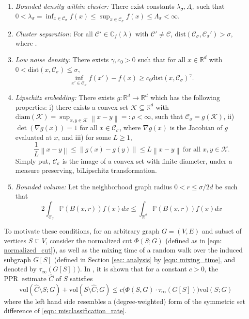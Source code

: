 \documentclass{article}
\newcommand{\diam}{\rho}
\newcommand{\vol}{\mathrm{vol}}
\newcommand{\Reals}{\mathbb{R}}
\newcommand{\Rd}{\Reals^d}
\newcommand{\norm}[1]{\left\lVert#1\right\rVert}
\newcommand{\1}{\mathbf{1}}
\newcommand{\dist}{\mathrm{dist}}
\newcommand{\Pbb}{\mathbb{P}}
\newcommand{\Cbb}{\mathbb{C}}
\newcommand{\Cset}{\mathcal{C}}
\newcommand{\Csig}{\Cset_{\sigma}}
\newcommand{\Cest}{\widehat{C}}
\newcommand{\pprspace}{{\sc PPR~}}
\theoremstyle{aldenthm}
\theoremstyle{aldenrmrk}
\begin{document}
\begin{enumerate}[label=(A\arabic*)]
	\item
	\label{asmp: bounded_density}
	\emph{Bounded density within cluster:} There exist constants $\lambda_{\sigma}, \Lambda_{\sigma}$ such that $0 < \lambda_{\sigma} = \inf_{x \in \Csig} f(x) \leq \sup_{x \in \Csig} f(x) \leq \Lambda_{\sigma} < \infty$.
	
	\item
	\label{asmp: cluster_separation}
	\emph{Cluster separation:}
	For all $\Cset' \in \Cbb_f(\lambda)$ with $\Cset' \not= \Cset$, $\dist(\Csig,\Csig') > \sigma$,
	where \smash{$\dist(\Csig,\Csig') := \inf_{x \in \Csig} \dist(x,\Csig')$}. 
	
	\item 
	\label{asmp: low_noise_density}
	\emph{Low noise density:} There exists $\gamma,c_0 > 0$ such that for all $x
	\in \Rd$ with $0 < \dist(x, \Csig) \leq \sigma$,   
	$$
	\inf_{x' \in \Csig} f(x') - f(x) \geq  c_0 \dist(x, \Csig)^{\gamma}.
	$$ 
	
	\item
	\label{asmp: embedding}
	\emph{Lipschitz embedding:}
	There exists $g: \Reals^d \to \Reals^d$ which has the following properties: i) there exists a convex set $\mathcal{K} \subseteq \Rd$ with $\mathrm{diam}(\mathcal{K}) = \sup_{x,y \in \mathcal{K}}\norm{x - y} =: \diam < \infty$, such that $\Csig = g(\mathcal{K})$, ii) $\det(\nabla g (x)) = 1$ for all $x \in \Csig$, where $\nabla g(x)$ is the Jacobian of $g$ evaluated at $x$, and iii) for some $L \geq 1$, 
	\begin{equation*}
	\frac{1}{L}\norm{x - y} \leq \norm{g(x) - g(y)} \leq L \norm{x - y} ~ \text{for all $x,y \in \mathcal{K}$}.
	\end{equation*}
	Simply put, $\Csig$ is the image of a convex set with finite diameter, under a  measure preserving, biLipschitz transformation.
	\item
	\label{asmp: bounded_volume}
	\emph{Bounded volume:}
	Let the neighborhood graph radius $0 < r \leq \sigma/2d$ be such that
	\begin{equation*}
	2 \int_{\Csig} \Pbb(B(x,r)) f(x) dx \leq \int_{\Rd} \Pbb(B(x,r)) f(x) dx
	\end{equation*}
\end{enumerate}

To motivate these conditions, for an arbitrary graph $G = (V,E)$ and subset of vertices $S \subseteq V$, consider the normalized cut $\Phi(S;G)$ (defined as in \eqref{eqn: normalized_cut}), as well as the mixing time of a random walk over the induced subgraph $G[S]$ (defined in Section \ref{sec: analysis} by \eqref{eqn: mixing_time}, and denoted by $\tau_{\infty}(G[S])$). In \citet{zhu2013}, it is shown that for a constant $c > 0$, the \pprspace estimate $\Cest$ of $S$ satisfies
\begin{equation}
\label{eqn: graph_symmetric_set_difference_1}
\vol(\Cest \setminus S; G) + \vol(S \setminus \Cest; G) \leq c \bigl( \Phi(S,G) \cdot \tau_{\infty}(G[S])\bigr) \vol(S;G)
\end{equation}
where the left hand side resembles a (degree-weighted) form of the symmetric set difference of \eqref{eqn: misclassification_rate}. 
\end{document}
